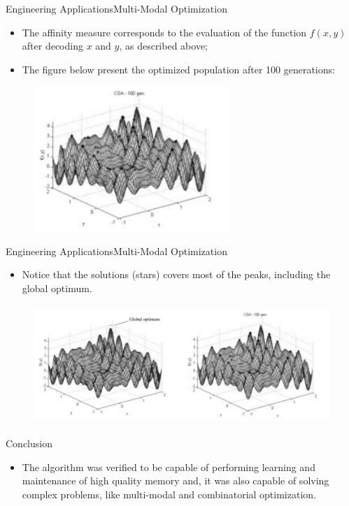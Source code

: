 \begin{frame}{Engineering Applications}{Multi-Modal Optimization}
\begin{itemize}
\item{The affinity measure corresponds to the evaluation of the
function \begin{math} f(x, y) \end{math} after decoding \begin{math} x \end{math} and \begin{math} y \end{math}, as described above;}
\item{The figure below present the  optimized population after 100
generations:}
\end{itemize}
\begin{figure}[h]
\centering
\includegraphics[height=5.5cm]{img/cj_func_maxi_100.png}
\end{figure}
\end{frame}

\begin{frame}{Engineering Applications}{Multi-Modal Optimization}
\begin{itemize}
\item{Notice that the solutions (stars) covers most of the peaks, including the global optimum. }
\end{itemize}
\begin{figure}[h]
\centering
\includegraphics[height=4.5cm]{img/cj_func_and.png}
\end{figure}
\end{frame}


\begin{frame}{Conclusion}
\begin{itemize}
\item{The algorithm was verified to be capable of performing learning and maintenance of high quality memory and, it was also capable of solving complex problems, like multi-modal and combinatorial optimization.}
\end{itemize}

\end{frame}
